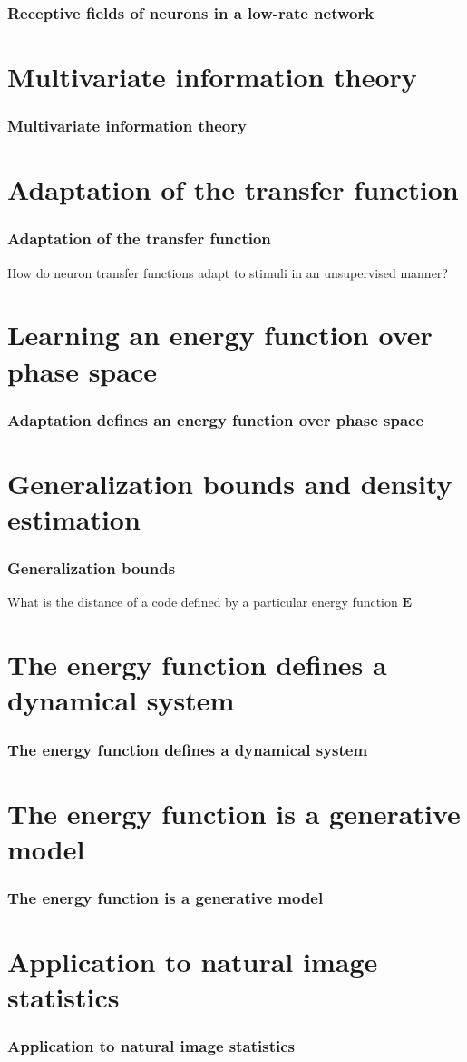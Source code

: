 \documentclass{beamer}
\begin{document}
\begin{frame}[plain]
\frametitle{Receptive fields of neurons in a low-rate network} 


\end{frame}

\section{Multivariate information theory} 

\begin{frame}[plain]
\frametitle{Multivariate information theory} 
\end{frame}

\section{Adaptation of the transfer function} 

\begin{frame}[plain]
\frametitle{Adaptation of the transfer function} 
How do neuron transfer functions adapt to stimuli in an unsupervised manner?
\end{frame}

\section{Learning an energy function over phase space} 

\begin{frame}[plain]
\frametitle{Adaptation defines an energy function over phase space} 
\end{frame}

\section{Generalization bounds and density estimation} 

\begin{frame}[plain]
\frametitle{Generalization bounds}
What is the distance of a code defined by a particular energy function $\mathbf{E}$
\end{frame}

\section{The energy function defines a dynamical system} 

\begin{frame}[plain]
\frametitle{The energy function defines a dynamical system} 
\end{frame}


\section{The energy function is a generative model} 

\begin{frame}[plain]
\frametitle{The energy function is a generative model} 
\end{frame}

\section{Application to natural image statistics} 

\begin{frame}[plain]
\frametitle{Application to natural image statistics} 
\end{frame}
\end{document}

